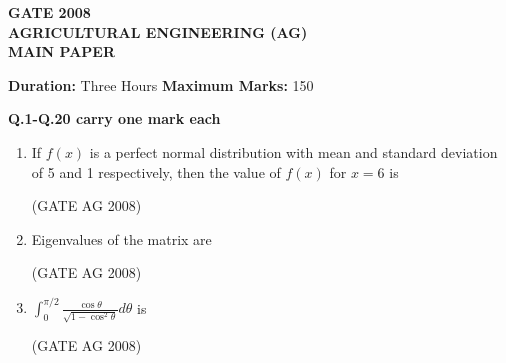 \documentclass[journal]{IEEEtran}
\begin{document}


\begin{center}
    \textbf{\Large GATE 2008\\
    AGRICULTURAL ENGINEERING (AG)\\
    MAIN PAPER}
\end{center}

\bigskip


\textbf{Duration:} Three Hours \hfill \textbf{Maximum Marks:} 150

\textbf{Q.1-Q.20 carry one mark each}

\medskip
\begin{enumerate}
\item 
 If $f(x)$ is a perfect normal distribution with mean and standard deviation of 5 and 1 respectively, then the value of $f(x)$ for $x = 6$ is
\begin{enumerate}
\end{enumerate}
\hfill(GATE AG 2008)\\

\medskip

\item 
 Eigenvalues of the matrix
  are 
\begin{enumerate}
\end{enumerate}
\hfill(GATE AG 2008)\\

\medskip

\item  
 
$ \int_0^{\pi/2} \frac{\cos \theta }{\sqrt{1 - \cos^2 \theta}} d\theta $ is 
\begin{enumerate}
\end{enumerate}
\hfill(GATE AG 2008)\\


\end{enumerate}
\end{document}
